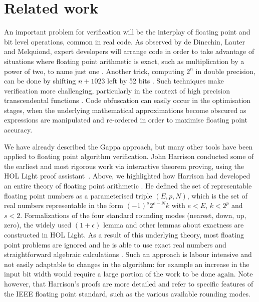 \documentclass{fac}
\begin{document}
\section{Related work}
\label{Related}
An important problem for verification will be the interplay of floating point and bit level operations, common in real code. As observed by de Dinechin, Lauter and Melquiond, expert developers will arrange code in order to take advantage of situations where floating point arithmetic is exact, such as multiplication by a power of two, to name just one \cite{de2006assisted}. Another trick, computing $2^n$ in double precision, can be done by shifting $n+1023$ left by 52 bits \cite{mine2012abstract}. Such techniques make verification more challenging, particularly in the context of high precision transcendental functions \cite{lee2016verifying}. Code obfuscation can easily occur in the optimisation stages, when the underlying mathematical approximations become obscured as expressions are manipulated and re-ordered in order to maximise floating point accuracy.

We have already described the Gappa approach, but many other tools have been applied to floating point algorithm verification. John Harrison conducted some of the earliest and most rigorous work via interactive theorem proving, using the HOL Light proof assistant~\cite{harrison1997floating}. Above, we highlighted how Harrison had developed an entire theory of floating point arithmetic \cite{harrison1999machine}. He defined the set of representable floating point numbers as a parameterised triple $(E,p,N)$, which is the set of real numbers representable in the form $(-1)^s 2^{e-N} k$ with $e<E$, $k<2^p$ and $s<2$. Formalizations of the four standard rounding modes (nearest, down, up, zero), the widely used $(1+\epsilon)$ lemma and other lemmas about exactness are constructed in HOL Light. As a result of this underlying theory, most floating point problems are ignored and he is able to use exact real numbers and straightforward algebraic calculations \cite{harrison1999machine}. Such an approach is labour intensive and not easily adaptable to changes in the algorithm: for example an increase in the input bit width would require a large portion of the work to be done again. Note however, that Harrison's proofs are more detailed and refer to specific features of the IEEE floating point standard, such as the various available rounding modes. 
\end{document}
